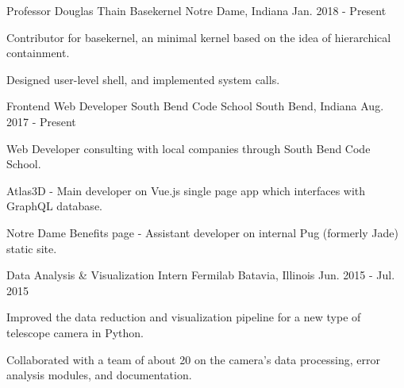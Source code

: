 \begin{cventries}
  \cventry
    {Professor Douglas Thain}
    {Basekernel}
    {Notre Dame, Indiana}
    {Jan. 2018 - Present}
    {
      \begin{cvitems}
        \item {Contributor for basekernel, an minimal kernel based on the idea of hierarchical containment.}
        \item {Designed user-level shell, and implemented system calls.}
        \item {\href{https://github.com/dthain/basekernel}{\faGithubSquare\acvHeaderIconSep\@Basekernel}}
      \end{cvitems}
    }
  \cventry
    {Frontend Web Developer}
    {South Bend Code School}
    {South Bend, Indiana}
    {Aug. 2017 - Present}
    {
      \begin{cvitems}
        \item {Web Developer consulting with local companies through South Bend Code School.}
        \item {Atlas3D - Main developer on Vue.js single page app which interfaces with GraphQL database.}
        \item {{Notre Dame Benefits page} - Assistant developer on internal Pug (formerly Jade) static site.\\}
      \end{cvitems}
    }
  \cventry
    {Data Analysis \& Visualization Intern}
    {Fermilab}
    {Batavia, Illinois}
    {Jun. 2015 - Jul. 2015}
    {
      \begin{cvitems}
        \item {Improved the data reduction and visualization pipeline for a new type
of telescope camera in Python.}
        \item {Collaborated with a team of about 20 on the camera’s data processing, error analysis modules, and documentation.}
      \end{cvitems}
    }
\end{cventries}
\iffalse
  \cventry
    {Donation Facilitator}
    {Notre Dame Alumni Center}
    {Notre Dame, Indiana}
    {Sep. 2016 - May. 2017}
    {
      \begin{cvitems}
        \item {Facilitated financial contributions to the University for various causes and campaigns.}
        \item {Exceeded the average amount of donations by more than 17\% in every report.}
      \end{cvitems}
    }
\fi
